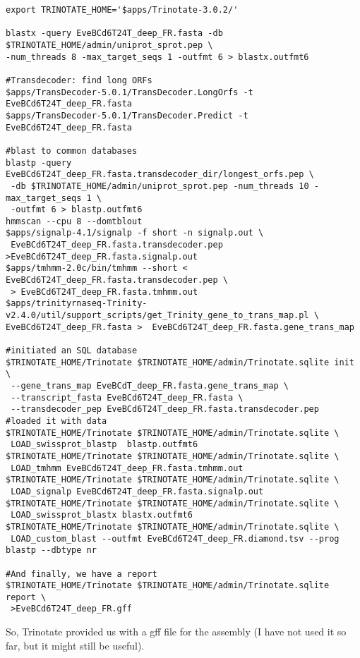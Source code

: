 \documentclass[12pt]{article}
\begin{document}
\small{
\begin{verbatim}
export TRINOTATE_HOME='$apps/Trinotate-3.0.2/'

blastx -query EveBCd6T24T_deep_FR.fasta -db $TRINOTATE_HOME/admin/uniprot_sprot.pep \
-num_threads 8 -max_target_seqs 1 -outfmt 6 > blastx.outfmt6

#Transdecoder: find long ORFs
$apps/TransDecoder-5.0.1/TransDecoder.LongOrfs -t EveBCd6T24T_deep_FR.fasta 
$apps/TransDecoder-5.0.1/TransDecoder.Predict -t EveBCd6T24T_deep_FR.fasta

#blast to common databases
blastp -query EveBCd6T24T_deep_FR.fasta.transdecoder_dir/longest_orfs.pep \
 -db $TRINOTATE_HOME/admin/uniprot_sprot.pep -num_threads 10 -max_target_seqs 1 \
 -outfmt 6 > blastp.outfmt6
hmmscan --cpu 8 --domtblout 
$apps/signalp-4.1/signalp -f short -n signalp.out \ 
 EveBCd6T24T_deep_FR.fasta.transdecoder.pep >EveBCd6T24T_deep_FR.fasta.signalp.out
$apps/tmhmm-2.0c/bin/tmhmm --short < EveBCd6T24T_deep_FR.fasta.transdecoder.pep \
 > EveBCd6T24T_deep_FR.fasta.tmhmm.out
$apps/trinityrnaseq-Trinity-v2.4.0/util/support_scripts/get_Trinity_gene_to_trans_map.pl \
EveBCd6T24T_deep_FR.fasta >  EveBCd6T24T_deep_FR.fasta.gene_trans_map

#initiated an SQL database
$TRINOTATE_HOME/Trinotate $TRINOTATE_HOME/admin/Trinotate.sqlite init \
 --gene_trans_map EveBCdT_deep_FR.fasta.gene_trans_map \
 --transcript_fasta EveBCd6T24T_deep_FR.fasta \
 --transdecoder_pep EveBCd6T24T_deep_FR.fasta.transdecoder.pep
#loaded it with data
$TRINOTATE_HOME/Trinotate $TRINOTATE_HOME/admin/Trinotate.sqlite \
 LOAD_swissprot_blastp  blastp.outfmt6
$TRINOTATE_HOME/Trinotate $TRINOTATE_HOME/admin/Trinotate.sqlite \ 
 LOAD_tmhmm EveBCd6T24T_deep_FR.fasta.tmhmm.out
$TRINOTATE_HOME/Trinotate $TRINOTATE_HOME/admin/Trinotate.sqlite \ 
 LOAD_signalp EveBCd6T24T_deep_FR.fasta.signalp.out
$TRINOTATE_HOME/Trinotate $TRINOTATE_HOME/admin/Trinotate.sqlite \
 LOAD_swissprot_blastx blastx.outfmt6
$TRINOTATE_HOME/Trinotate $TRINOTATE_HOME/admin/Trinotate.sqlite \
 LOAD_custom_blast --outfmt EveBCd6T24T_deep_FR.diamond.tsv --prog blastp --dbtype nr 

#And finally, we have a report
$TRINOTATE_HOME/Trinotate $TRINOTATE_HOME/admin/Trinotate.sqlite report \ 
 >EveBCd6T24T_deep_FR.gff
\end{verbatim}
}

So, Trinotate provided us with a gff file for the assembly (I have not used it so far, but it might still be useful). 

\end{document}

